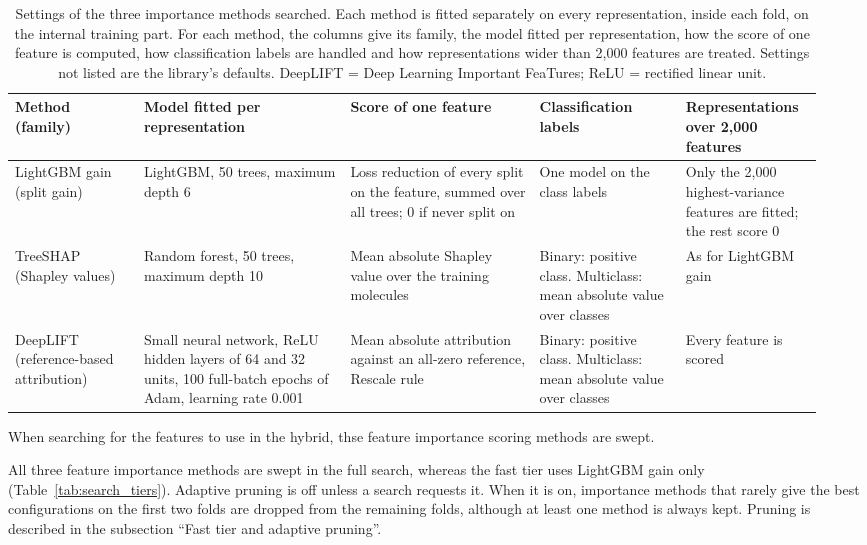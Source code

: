 \begin{table}[htbp]
\centering
\small
\begin{adjustbox}{max width=\textwidth}
\begin{tabular}{@{}P{0.15\linewidth}P{0.24\linewidth}P{0.22\linewidth}P{0.17\linewidth}P{0.16\linewidth}@{}}
\toprule
Method (family) & Model fitted per representation & Score of one feature & Classification labels & Representations over 2{,}000 features \\
\midrule
LightGBM gain (split gain) & LightGBM, 50 trees, maximum depth 6 & Loss reduction of every split on the feature, summed over all trees; 0 if never split on & One model on the class labels & Only the 2{,}000 highest-variance features are fitted; the rest score 0 \\
TreeSHAP (Shapley values) & Random forest, 50 trees, maximum depth 10 & Mean absolute Shapley value over the training molecules & Binary: positive class. Multiclass: mean absolute value over classes & As for LightGBM gain \\
DeepLIFT (reference-based attribution) & Small neural network, ReLU hidden layers of 64 and 32 units, 100 full-batch epochs of Adam, learning rate 0.001 & Mean absolute attribution against an all-zero reference, Rescale rule & Binary: positive class. Multiclass: mean absolute value over classes & Every feature is scored \\
\bottomrule
\end{tabular}
\end{adjustbox}
\caption[Settings of the three importance methods searched.]{Settings of the three importance methods searched. Each method is fitted separately on every representation, inside each fold, on the internal training part. For each method, the columns give its family, the model fitted per representation, how the score of one feature is computed, how classification labels are handled and how representations wider than 2{,}000 features are treated. Settings not listed are the library's defaults. DeepLIFT = Deep Learning Important FeaTures; ReLU = rectified linear unit.}
\label{tab:importance_methods}
\end{table}

When searching for the features to use in the hybrid, thse feature importance scoring methods are swept.

All three feature importance methods are swept in the full search, whereas the fast tier uses LightGBM gain only (Table~\ref{tab:search_tiers}). Adaptive pruning is off unless a search requests it. When it is on, importance methods that rarely give the best configurations on the first two folds are dropped from the remaining folds, although at least one method is always kept. Pruning is described in the subsection ``Fast tier and adaptive pruning''.

